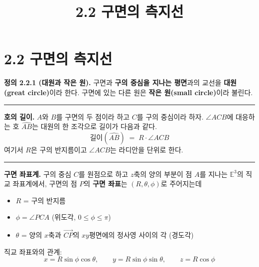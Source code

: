 \documentclass{article}
\title{2.2 구면의 측지선}
\date{}
\author{}
\begin{document}
\maketitle

\section*{2.2 구면의 측지선}

\begin{tcolorbox}[
  colback=teal!4, colframe=teal!65!black,
  title=정의 \& 핵심 규칙,
  fonttitle=\bfseries, boxrule=0.5mm, arc=3mm]

\textbf{\textcolor{teal!65!black}{정의 2.2.1 (대원과 작은 원).}}\quad
구면과 \textbf{구의 중심을 지나는 평면}과의 교선을 \textbf{대원(great circle)}이라 한다.
구면에 있는 다른 원은 \textbf{작은 원(small circle)}이라 불린다.

\noindent\textcolor{teal!50!black}{\rule{\linewidth}{0.4pt}}

\textbf{\textcolor{teal!65!black}{호의 길이.}}\quad
$A$와 $B$를 구면의 두 점이라 하고 $C$를 구의 중심이라 하자.
$\angle ACB$에 대응하는 호 $\widehat{AB}$는 대원의 한 조각으로 길이가 다음과 같다.
\[
  \text{길이}(\widehat{AB}) \;=\; R \cdot \angle ACB
\]
여기서 $R$은 구의 반지름이고 $\angle ACB$는 라디안을 단위로 한다.

\noindent\textcolor{teal!50!black}{\rule{\linewidth}{0.4pt}}

\textbf{\textcolor{teal!65!black}{구면 좌표계.}}\quad
구의 중심 $C$를 원점으로 하고 $z$축의 양의 부분이 점 $A$를 지나는 $\mathbb{E}^3$의 직교 좌표계에서,
구면의 점 $P$의 \textbf{구면 좌표}는 $(R, \theta, \phi)$로 주어지는데
\begin{itemize}\setlength\itemsep{0pt}
  \item $R$ = 구의 반지름
  \item $\phi = \angle PCA$ \quad (위도각, $0 \leq \phi \leq \pi$)
  \item $\theta$ = 양의 $x$축과 $\overrightarrow{CP}$의 $xy$평면에의 정사영 사이의 각 \quad (경도각)
\end{itemize}
직교 좌표와의 관계:
\[
  x = R\sin\phi\cos\theta, \qquad y = R\sin\phi\sin\theta, \qquad z = R\cos\phi
\]

\end{tcolorbox}
\end{document}
